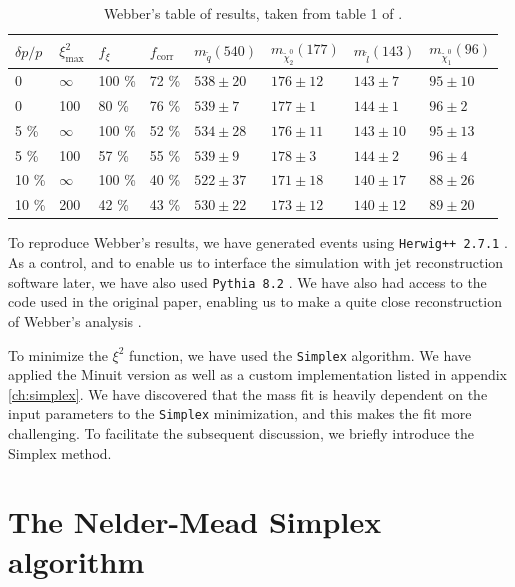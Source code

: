 \documentclass[twoside,english]{uiofysmaster}
\begin{document}
\begin{table}[hbt]
	\centering
	\begin{tabular}{| l | l | l | l  || l | l | l | l |}
		\hline
		$\delta p/p$ & $\xi^2_\mathrm{max}$ & $f_\xi$ & $f_\mathrm{corr}$ & $m_{\tilde q} (540)$ & $m_{\tilde \chi_2^0} (177)$ & $m_{\tilde l} (143)$ & $m_{\tilde \chi_1^0} (96)$ \\
		\hline \hline
		0 & 	$\infty$ &	100 \%	& 72 \%	& $538 \pm 20$	&	$176 \pm 12$	&	$143 \pm 7$	& 	$95 \pm 10$	\\
		0 &		100 &		80 \%	& 76 \% & $539 \pm 7$	&	$177 \pm 1$		&	$144 \pm 1$	&	$96 \pm 2$	\\
		5 \% &	$\infty$ &	100 \%	& 52 \% & $534 \pm 28$	& 	$176 \pm 11$	&	$143 \pm 10$&	$95 \pm 13$ \\
		5 \% &	100 &		57 \%	& 55 \% & $539 \pm 9$	&	$178 \pm 3$		& 	$144 \pm 2$	&	$96 \pm 4$	\\
		10 \% &	$\infty$ &	100 \%	& 40 \% & $522 \pm 37$	&	$171 \pm 18$	&	$140 \pm 17$&	$88 \pm 26$	\\
		10 \% &	200 &		42 \%	& 43 \% & $530 \pm 22$	& 	$173 \pm 12$	&	$140 \pm 12$&	$89 \pm 20$ \\
		\hline
	\end{tabular}
	\caption{Webber's table of results, taken from table 1 of \cite{Webber:2009vm}.}
	\label{table:webber_original}
\end{table}


To reproduce Webber's results, we have generated events using {\tt Herwig++ 2.7.1} \cite{Bahr:2008pv}. As a control, and to enable us to interface the simulation with jet reconstruction software later, we have also used {\tt Pythia 8.2} \cite{Sjostrand:2014zea}. We have also had access to the code used in the original paper, enabling us to make a quite close reconstruction of Webber's analysis \cite{Webber:epost}. 

To minimize the $\xi^2$ function, we have used the {\tt Simplex} algorithm. We have applied the Minuit version as well as a custom implementation listed in appendix \ref{ch:simplex}. We have discovered that the mass fit is heavily dependent on the input parameters to the {\tt Simplex} minimization, and this makes the fit more challenging. To facilitate the subsequent discussion, we briefly introduce the Simplex method.

\section{The Nelder-Mead Simplex algorithm}
\end{document}
